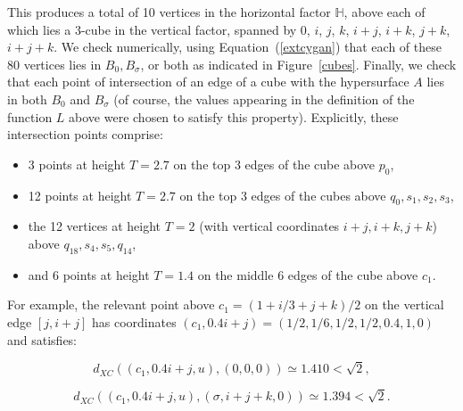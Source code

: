 \documentclass{article}[12pt]
\newcommand{\quat}{\mathbb{H}}
\begin{document}
 This produces a total of 10 vertices in the horizontal factor $\quat$, above each of which lies a 3-cube in the vertical factor, spanned by $0$, $i$, $j$, $k$, $i+j$, $i+k$, $j+k$, $i+j+k$.  We check numerically, using Equation~(\ref{extcygan}) that each of these 80 vertices lies in $B_0,B_\sigma$, or both as indicated in Figure~\ref{cubes}. Finally, we check that each point of intersection of an edge of a cube with the hypersurface $A$ lies in both $B_0$ and $B_\sigma$ (of course, the values appearing in the definition of the function $L$ above were chosen to satisfy this property). Explicitly, these intersection points comprise:
 \begin{itemize}
 \item 3 points at height $T=2.7$ on the top 3 edges of the cube above $p_0$,
 \item 12 points at height $T=2.7$ on the top 3 edges of the cubes above $q_0,s_1,s_2,s_3$,
 \item the 12 vertices at height $T=2$ (with vertical coordinates $i+j, i+k, j+k$) above $q_{18},s_4,s_5,q_{14}$,
 \item and 6 points at height $T=1.4$ on the middle 6 edges of the cube above $c_1$.
 \end{itemize}
 
For example, the relevant point above $c_1=(1+i/3+j+k)/2$ on the vertical edge $[j,i+j]$ has coordinates $(c_1,0.4i+j)=(1/2,1/6,1/2,1/2,0.4,1,0)$ and satisfies:

$$d_{XC}\left((c_1,0.4i+j,u),(0,0,0)\right) \simeq  1.410 < \sqrt{2},
$$

$$d_{XC}\left((c_1,0.4i+j,u),(\sigma,i+j+k,0)\right) \simeq 1.394 < \sqrt{2}. 
$$
\end{document}
